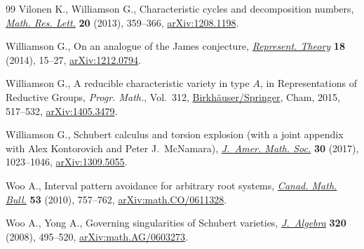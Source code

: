 \documentclass[pdftex]{sigma}
\numberwithin{equation}{section}
\begin{document}
\begin{thebibliography}{99}
Vilonen K., Williamson G., Characteristic cycles and decomposition numbers,
 \href{https://doi.org/10.4310/MRL.2013.v20.n2.a11}{\textit{Math. Res. Lett.}} \textbf{20} (2013), 359--366, \href{https://arxiv.org/abs/1208.1198}{arXiv:1208.1198}.

Williamson G., On an analogue of the {J}ames conjecture, \href{https://doi.org/10.1090/S1088-4165-2014-00447-3}{\textit{Represent.
 Theory}} \textbf{18} (2014), 15--27, \href{https://arxiv.org/abs/1212.0794}{arXiv:1212.0794}.

Williamson G., A reducible characteristic variety in type {$A$}, in
 Representations of Reductive Groups, \textit{Progr. Math.}, Vol.~312,
 \href{https://doi.org/10.1007/978-3-319-23443-4_19}{Birkh\"auser/Springer}, Cham, 2015, 517--532, \href{https://arxiv.org/abs/1405.3479}{arXiv:1405.3479}.

Williamson G., Schubert calculus and torsion explosion (with a joint appendix
 with Alex Kontorovich and Peter J.~McNamara), \href{https://doi.org/10.1090/jams/868}{\textit{J.~Amer. Math. Soc.}}
 \textbf{30} (2017), 1023--1046, \href{https://arxiv.org/abs/1309.5055}{arXiv:1309.5055}.

Woo A., Interval pattern avoidance for arbitrary root systems, \href{https://doi.org/10.4153/CMB-2010-080-2}{\textit{Canad.
 Math. Bull.}} \textbf{53} (2010), 757--762, \href{https://arxiv.org/abs/math.CO/0611328}{arXiv:math.CO/0611328}.

Woo A., Yong A., Governing singularities of {S}chubert varieties,
 \href{https://doi.org/10.1016/j.jalgebra.2007.12.016}{\textit{J.~Algebra}} \textbf{320} (2008), 495--520, \href{https://arxiv.org/abs/math.AG/0603273}{arXiv:math.AG/0603273}.

\end{thebibliography}\LastPageEnding
\end{document}
